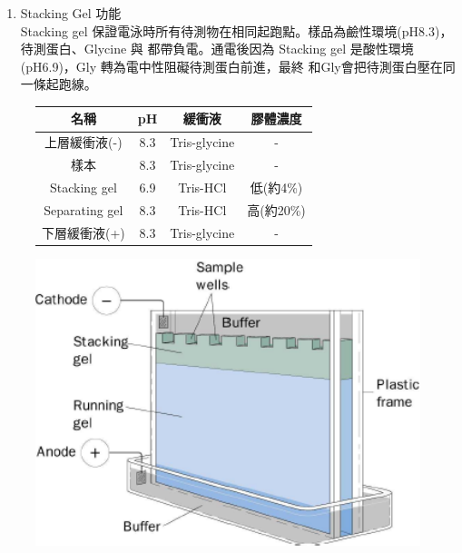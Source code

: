 \begin{enumerate}
  \begin{enumerate}[label=\alph*.]
    \item Stacking Gel 功能\\
    \qquad Stacking gel 保證電泳時所有待測物在相同起跑點。樣品為鹼性環境(pH8.3)，待測蛋白、Glycine 與  都帶負電。通電後因為 Stacking gel 是酸性環境(pH6.9)，Gly 轉為電中性阻礙待測蛋白前進，最終 和Gly會把待測蛋白壓在同一條起跑線。
  \end{enumerate}

  \begin{figure}[H]
    \begin{minipage}[h]{0.6\textwidth} %
      \begin{tabular}{cccc}
        \toprule
        名稱  &pH &緩衝液&膠體濃度\\
        \midrule
        上層緩衝液(-) & 8.3 & Tris-glycine & - \\ 
        樣本 & 8.3 & Tris-glycine & -\\
        Stacking gel& 6.9& Tris-HCl & 低(約4\%)\\
        Separating gel& 8.3& Tris-HCl &高(約20\%)\\
        下層緩衝液(+) & 8.3& Tris-glycine & -\\
        \bottomrule
        \end{tabular}
    \end{minipage}
    \begin{minipage}[h]{0.35\textwidth} %
    \centering
    \includegraphics[width=1\textwidth]{paste_src/2023-11-13-16-00-45.png}
    \end{minipage}
  \end{figure}
\end{enumerate}


